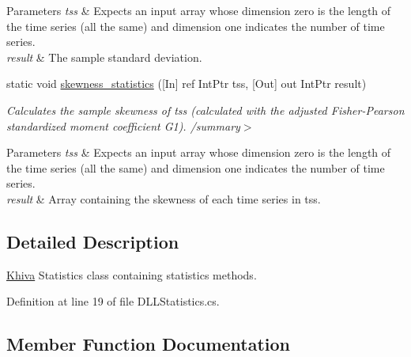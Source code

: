\begin{DoxyCompactItemize}
\begin{DoxyCompactList}
\begin{DoxyParams}{Parameters}
{\em tss} & Expects an input array whose dimension zero is the length of the time series (all the same) and dimension one indicates the number of time series.\\
\hline
{\em result} & The sample standard deviation.\\
\hline
\end{DoxyParams}
\end{DoxyCompactList}\item 
static void \mbox{\hyperlink{classkhiva_1_1interop_1_1_d_l_l_statistics_a8b1aee0f04bf7185e91460e4b861f8eb}{skewness\+\_\+statistics}} (\mbox{[}In\mbox{]} ref Int\+Ptr tss, \mbox{[}Out\mbox{]} out Int\+Ptr result)
\begin{DoxyCompactList}\small\item\em Calculates the sample skewness of tss (calculated with the adjusted Fisher-\/\+Pearson standardized moment coefficient G1). /summary$>$ 
\begin{DoxyParams}{Parameters}
{\em tss} & Expects an input array whose dimension zero is the length of the time series (all the same) and dimension one indicates the number of time series.\\
\hline
{\em result} & Array containing the skewness of each time series in tss.\\
\hline
\end{DoxyParams}
\end{DoxyCompactList}\end{DoxyCompactItemize}


\subsection{Detailed Description}
\mbox{\hyperlink{classkhiva_1_1_khiva}{Khiva}} Statistics class containing statistics methods. 



Definition at line 19 of file D\+L\+L\+Statistics.\+cs.



\subsection{Member Function Documentation}
\mbox{\label{classkhiva_1_1interop_1_1_d_l_l_statistics_a4469f0b7a6f6e67948fe659de6c3cd7e}} 
